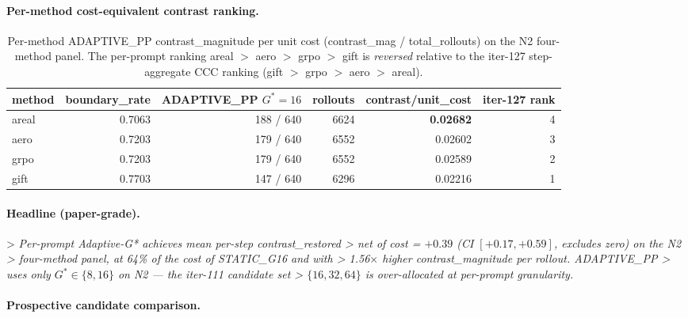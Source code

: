 \paragraph{Per-method cost-equivalent contrast ranking.}

\begin{table}[ht]
\centering\small
\caption{Per-method ADAPTIVE\_PP contrast\_magnitude per unit cost
(contrast\_mag / total\_rollouts) on the N2 four-method panel. The per-prompt
ranking areal $>$ aero $>$ grpo $>$ gift is \emph{reversed} relative to the
iter-127 step-aggregate CCC ranking (gift $>$ grpo $>$ aero $>$ areal).}
\label{tab:p7-iter131-method-ranking}
\begin{tabular}{lrrrrr}
\toprule
method & boundary\_rate & ADAPTIVE\_PP $G^*=16$ & rollouts & contrast/unit\_cost & iter-127 rank \\
\midrule
areal  & 0.7063 & 188 / 640 & 6624 & \textbf{0.02682} & 4 \\
aero   & 0.7203 & 179 / 640 & 6552 & 0.02602         & 3 \\
grpo   & 0.7203 & 179 / 640 & 6552 & 0.02589         & 2 \\
gift   & 0.7703 & 147 / 640 & 6296 & 0.02216         & 1 \\
\bottomrule
\end{tabular}
\end{table}

\paragraph{Headline (paper-grade).}

> \emph{Per-prompt Adaptive-G* achieves mean per-step contrast\_restored
> net of cost = $+0.39$ (CI $[+0.17, +0.59]$, excludes zero) on the N2
> four-method panel, at 64\% of the cost of STATIC\_G16 and with
> 1.56$\times$ higher contrast\_magnitude per rollout. ADAPTIVE\_PP
> uses only $G^* \in \{8, 16\}$ on N2 --- the iter-111 candidate set
> $\{16, 32, 64\}$ is over-allocated at per-prompt granularity.}

\paragraph{Prospective candidate comparison.}


